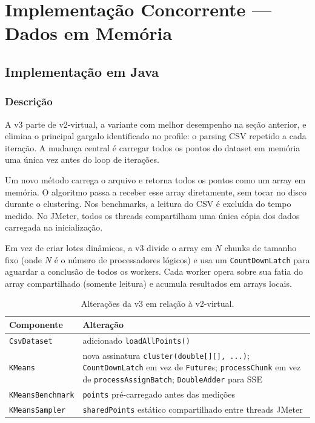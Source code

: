 \section{Implementação Concorrente --- Dados em Memória}
\label{sec:concurrent-x}

\subsection{Implementação em Java}

\subsubsection{Descrição}

A v3 parte de v2-virtual, a variante com melhor desempenho na seção anterior, e
elimina o principal gargalo identificado no profile: o parsing CSV repetido a cada
iteração. A mudança central é carregar todos os pontos do dataset em memória uma
única vez antes do loop de iterações.

Um novo método carrega o arquivo e retorna todos os pontos como um array em memória.
O algoritmo passa a receber esse array diretamente, sem tocar no disco durante o
clustering. Nos benchmarks, a leitura do CSV é excluída do tempo medido. No JMeter,
todos os threads compartilham uma única cópia dos dados carregada na inicialização.

Em vez de criar lotes dinâmicos, a v3 divide o array em $N$ chunks de tamanho fixo
(onde $N$ é o número de processadores lógicos) e usa um \texttt{CountDownLatch} para
aguardar a conclusão de todos os workers. Cada worker opera sobre sua fatia do array
compartilhado (somente leitura) e acumula resultados em arrays locais.

\begin{table}[H]
\centering
\begin{tabular}{lp{12cm}}
\hline
\textbf{Componente} & \textbf{Alteração} \\
\hline
\texttt{CsvDataset}      & adicionado \texttt{loadAllPoints()} \\
\texttt{KMeans}          & nova assinatura \texttt{cluster(double[][], ...)};
                           \texttt{CountDownLatch} em vez de \texttt{Future}s;
                           \texttt{processChunk} em vez de \texttt{processAssignBatch};
                           \texttt{DoubleAdder} para SSE \\
\texttt{KMeansBenchmark} & \texttt{points} pré-carregado antes das medições \\
\texttt{KMeansSampler}   & \texttt{sharedPoints} estático compartilhado entre threads JMeter \\
\hline
\end{tabular}
\caption{Alterações da v3 em relação à v2-virtual.}
\label{tab:v3-changes}
\end{table}

